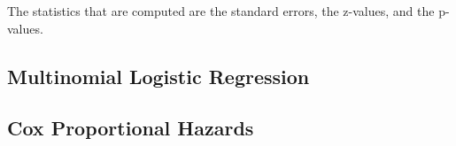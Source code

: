 \documentclass[12pt]{article}
\begin{document}
The statistics that are computed are the standard errors, the z-values, and the p-values.  
\subsection{Multinomial Logistic Regression}

\subsection{Cox Proportional Hazards}

\end{document}

